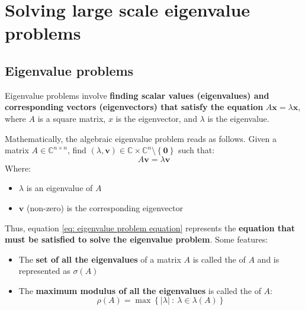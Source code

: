 \section{Solving large scale eigenvalue problems}

\subsection{Eigenvalue problems}

Eigenvalue problems involve \textbf{finding scalar values (eigenvalues) and corresponding vectors (eigenvectors) that satisfy the equation} $A\mathbf{x} = \lambda \mathbf{x}$, where $A$ is a square matrix, $x$ is the eigenvector, and $\lambda$ is the eigenvalue.

\highspace
Mathematically, the algebraic eigenvalue problem reads as follows. Given a matrix $A \in \mathbb{C}^{n \times n}$, find $\left(\lambda, \mathbf{v}\right) \in \mathbb{C} \times \mathbb{C}^{n} \setminus \left\{\mathbf{0}\right\}$ such that:
\begin{equation}\label{eq: eigenvalue problem equation}
    A\mathbf{v} = \lambda\mathbf{v}
\end{equation}
Where:
\begin{itemize}
    \item $\lambda$ is an eigenvalue of $A$
    \item $\mathbf{v}$ (non-zero) is the corresponding eigenvector
\end{itemize}
Thus, equation \ref{eq: eigenvalue problem equation} represents the \textbf{equation that must be satisfied to solve the eigenvalue problem}. Some features:
\begin{itemize}
    \item The \textbf{set of all the eigenvalues} of a matrix $A$ is called the  of $A$ and is represented as $\sigma\left(A\right)$
    \item The \textbf{maximum modulus of all the eigenvalues} is called the  of $A$:
    \begin{equation}
        \rho\left(A\right) = \max\left\{\left|\lambda\right| \: : \: \lambda \in \lambda\left(A\right)\right\}
    \end{equation}
\end{itemize}

